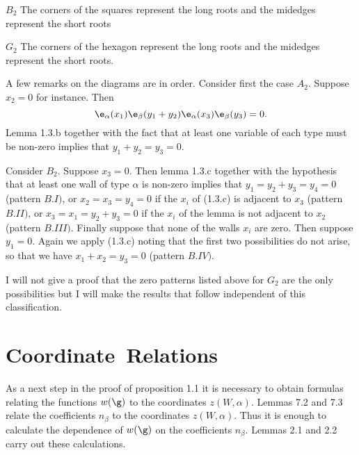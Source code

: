 \documentclass{memo-l}
\theoremstyle{definition}
\theoremstyle{remark}
\numberwithin{section}{chapter}
\numberwithin{equation}{chapter}
\begin{document}
\medskip
\medskip

\noindent $B_2$  The corners of the squares represent the long roots
and the midedges represent the short roots

\medskip
\medskip

\noindent $G_2$  The corners of the hexagon represent the long roots
and the midedges represent the short roots.
\nobreak
\medskip

\medskip
\box\boxI
\medskip

A few remarks on the diagrams are in order.  Consider first the case $A_{2}$. 
Suppose $x_{2}=0$ for instance.   Then
$$
\e_\alpha(x_{1}){\e}_{\beta}(y_{1}+y_{2})
{\e}_{\alpha}(x_{3}){\e}_{\beta}(y_{3}) = 0.
$$ 
Lemma 1.3.b together with the fact that at least one variable of each 
type must be non-zero implies that $y_{1}+y_{2}=y_{3}=0$.

Consider $B_{2}$.  Suppose $x_{3} = 0$. 
 Then lemma 1.3.c together with the hypothesis that at least one wall of 
type ${\alpha}$ is non-zero implies that $y_{1} = y_{2}+y_{3} = y_{4} = 0$ 
(pattern $B.I)$, or $x_{2} = x_{3} = y_{4} = 0$ if the $x_{i}$ of (1.3.c) is 
adjacent to $x_{3}$ (pattern $B.II)$, or $x_{3} = x_{1} = y_{2}+y_{3} = 0$ 
if the $x_{i}$ of the lemma is not adjacent to $x_{2}$ (pattern $B.III)$. 
 Finally suppose that none of the walls $x_{i}$ are zero. 
 Then suppose $y_{1} = 0$. 
 Again we apply (1.3.c) noting that the first two possibilities do not 
arise, so that we have $x_{1}+x_{2} = y_{3} = 0$ (pattern $B.IV)$.

   I will not give a proof that the zero patterns listed above for $G_{2}$ 
are the only possibilities but I will make the results that follow independent 
of this classification.

\section{Coordinate\ Relations}

   As a next step in the proof of proposition 1.1 it is necessary to obtain 
formulas relating the functions $w({\g})$ to the coordinates 
$z(W,{\alpha})$.   Lemmas 7.2 and 7.3 relate the coefficients $n_{\beta}$ 
to the coordinates $z(W,{\alpha})$. 
 Thus it is enough to calculate the dependence of $w({\g})$ on the 
coefficients $n_{\beta}$. 
  Lemmas 2.1 and 2.2 carry out these calculations.

\medpagebreak
\end{document}
